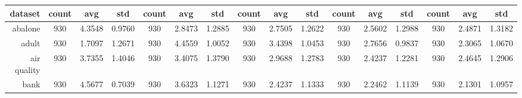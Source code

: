 \begin{table}[htbp]
{\begin{tabular}{rccccccccccccccc}
			\cmidrule{2-16}    \textbf{dataset} & \textbf{count}                           & \textbf{avg}                                                              & \textbf{std}    & \textbf{count}                 & \textbf{avg}    & \textbf{std}    & \textbf{count}                  & \textbf{avg}    & \textbf{std}    & \textbf{count}                  & \textbf{avg}                                                              & \textbf{std}    & \textbf{count}                  & \textbf{avg}                                                                       & \textbf{std}    \\
			\midrule
			abalone                             & 930                                      & 4.3548                                                                    & 0.9760          & 930                            & 2.8473          & 1.2885          & 930                             & 2.7505          & 1.2622          & 930                             & 2.5602                                                                    & 1.2988          & 930                             & \cellcolor[rgb]{ .776,  .937,  .808}\textcolor[rgb]{ 0,  .38,  0}{2.4871}          & 1.3182          \\
			adult                               & 930                                      & \cellcolor[rgb]{ .776,  .937,  .808}\textcolor[rgb]{ 0,  .38,  0}{1.7097} & 1.2671          & 930                            & 4.4559          & 1.0052          & 930                             & 3.4398          & 1.0453          & 930                             & 2.7656                                                                    & 0.9837          & 930                             & 2.3065                                                                             & 1.0670          \\
			air quality                         & 930                                      & 3.7355                                                                    & 1.4046          & 930                            & 3.4075          & 1.3790          & 930                             & 2.9688          & 1.2783          & 930                             & \cellcolor[rgb]{ .776,  .937,  .808}\textcolor[rgb]{ 0,  .38,  0}{2.4237} & 1.2281          & 930                             & 2.4645                                                                             & 1.2906          \\
			bank                                & 930                                      & 4.5677                                                                    & 0.7039          & 930                            & 3.6323          & 1.1271          & 930                             & 2.4237          & 1.1333          & 930                             & 2.2462                                                                    & 1.1139          & 930                             & \cellcolor[rgb]{ .776,  .937,  .808}\textcolor[rgb]{ 0,  .38,  0}{2.1301}          & 1.0957          \\

\end{tabular}}
\end{table}
